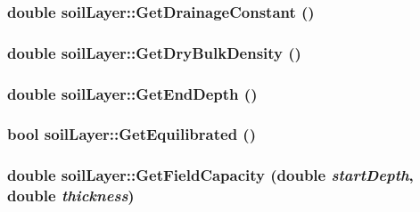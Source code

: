 \label{classsoil_layer_a65c071c06b636ea34ba54ea59d00d2ae}
\hypertarget{classsoil_layer_a4aaa4a203fb9bd489fabb45eaee0aa6c}{
\subsubsection[{GetDrainageConstant}]{\setlength{\rightskip}{0pt plus 5cm}double soilLayer::GetDrainageConstant ()}}
\label{classsoil_layer_a4aaa4a203fb9bd489fabb45eaee0aa6c}
\hypertarget{classsoil_layer_a208a49fb1c6c738e50e5070682031a0c}{
\subsubsection[{GetDryBulkDensity}]{\setlength{\rightskip}{0pt plus 5cm}double soilLayer::GetDryBulkDensity ()}}
\label{classsoil_layer_a208a49fb1c6c738e50e5070682031a0c}
\hypertarget{classsoil_layer_ab046484e00090278933a7e253e9fc004}{
\subsubsection[{GetEndDepth}]{\setlength{\rightskip}{0pt plus 5cm}double soilLayer::GetEndDepth ()}}
\label{classsoil_layer_ab046484e00090278933a7e253e9fc004}
\hypertarget{classsoil_layer_a0ed01627fab5acb65cb417906abb17ba}{
\subsubsection[{GetEquilibrated}]{\setlength{\rightskip}{0pt plus 5cm}bool soilLayer::GetEquilibrated ()}}
\label{classsoil_layer_a0ed01627fab5acb65cb417906abb17ba}
\hypertarget{classsoil_layer_a64c5886c99eaf6400f8668db437b1133}{
\subsubsection[{GetFieldCapacity}]{\setlength{\rightskip}{0pt plus 5cm}double soilLayer::GetFieldCapacity (double {\em startDepth}, \/  double {\em thickness})}}
